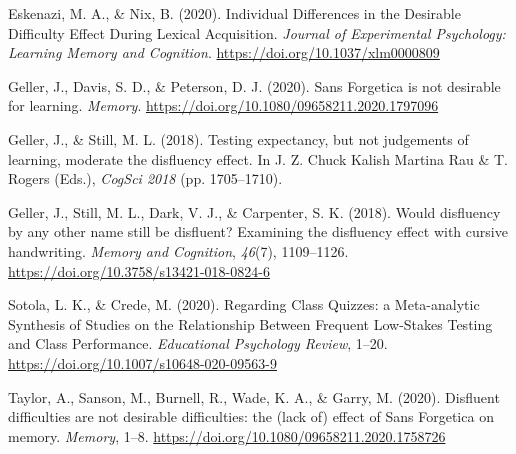 \documentclass[
  english,
  man]{apa6}
\begin{document}
\leavevmode\hypertarget{ref-Eskenazi2020}{}%
Eskenazi, M. A., \& Nix, B. (2020). Individual Differences in the Desirable Difficulty Effect During Lexical Acquisition. \emph{Journal of Experimental Psychology: Learning Memory and Cognition}. \url{https://doi.org/10.1037/xlm0000809}

\leavevmode\hypertarget{ref-Geller2020}{}%
Geller, J., Davis, S. D., \& Peterson, D. J. (2020). Sans Forgetica is not desirable for learning. \emph{Memory}. \url{https://doi.org/10.1080/09658211.2020.1797096}

\leavevmode\hypertarget{ref-cogsci18-Geller}{}%
Geller, J., \& Still, M. L. (2018). Testing expectancy, but not judgements of learning, moderate the disfluency effect. In J. Z. Chuck Kalish Martina Rau \& T. Rogers (Eds.), \emph{CogSci 2018} (pp. 1705--1710).

\leavevmode\hypertarget{ref-Geller2018}{}%
Geller, J., Still, M. L., Dark, V. J., \& Carpenter, S. K. (2018). Would disfluency by any other name still be disfluent? Examining the disfluency effect with cursive handwriting. \emph{Memory and Cognition}, \emph{46}(7), 1109--1126. \url{https://doi.org/10.3758/s13421-018-0824-6}

\leavevmode\hypertarget{ref-Sotola2020}{}%
Sotola, L. K., \& Crede, M. (2020). Regarding Class Quizzes: a Meta-analytic Synthesis of Studies on the Relationship Between Frequent Low-Stakes Testing and Class Performance. \emph{Educational Psychology Review}, 1--20. \url{https://doi.org/10.1007/s10648-020-09563-9}

\leavevmode\hypertarget{ref-Taylor2020}{}%
Taylor, A., Sanson, M., Burnell, R., Wade, K. A., \& Garry, M. (2020). Disfluent difficulties are not desirable difficulties: the (lack of) effect of Sans Forgetica on memory. \emph{Memory}, 1--8. \url{https://doi.org/10.1080/09658211.2020.1758726}

\endgroup
\end{document}
